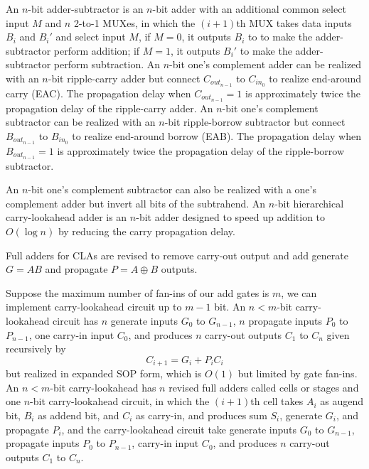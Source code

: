 \documentclass[a4paper,12pt]{report}
\begin{document}
An $n$-bit adder-subtractor is an $n$-bit adder with an additional common select input $M$ and $n$ 2-to-1 MUXes, in which the $(i+1)$th MUX takes data inputs $B_i$ and $B_i'$ and select input $M$, if $M=0$, it outputs $B_i$ to to make the adder-subtractor perform addition; if $M=1$, it outputs $B_i'$ to make the adder-subtractor perform subtraction.
An $n$-bit one's complement adder can be realized with an $n$-bit ripple-carry adder but connect $C_{out_{n-1}}$ to $C_{in_0}$ to realize end-around carry (EAC). The propagation delay when $C_{out_{n-1}}=1$ is approximately twice the propagation delay of the ripple-carry adder.
An $n$-bit one's complement subtractor can be realized with an $n$-bit ripple-borrow subtractor but connect $B_{out_{n-1}}$ to $B_{in_0}$ to realize end-around borrow (EAB). The propagation delay when $B_{out_{n-1}}=1$ is approximately twice the propagation delay of the ripple-borrow subtractor.

An $n$-bit one's complement subtractor can also be realized with a one's complement adder but invert all bits of the subtrahend.
An $n$-bit hierarchical carry-lookahead adder is an $n$-bit adder designed to speed up addition to $O(\log n)$ by reducing the carry propagation delay.

Full adders for CLAs are revised to remove carry-out output and add generate $G=AB$ and propagate $P=A\oplus B$ outputs.

Suppose the maximum number of fan-ins of our add gates is $m$, we can implement carry-lookahead circuit up to $m-1$ bit. An $n<m$-bit carry-lookahead circuit has $n$ generate inputs $G_0$ to $G_{n-1}$, $n$ propagate inputs $P_0$ to $P_{n-1}$, one carry-in input $C_0$, and produces $n$ carry-out outputs $C_1$ to $C_n$ given recursively by
\[C_{i+1}=G_i+P_iC_i\]
but realized in expanded SOP form, which is $O(1)$ but limited by gate fan-ins. An $n<m$-bit carry-lookahead has $n$ revised full adders called cells or stages and one $n$-bit carry-lookahead circuit, in which the $(i+1)$th cell takes $A_i$ as augend bit, $B_i$ as addend bit, and $C_i$ as carry-in, and produces sum $S_i$, generate $G_i$, and propagate $P_i$, and the carry-lookahead circuit take generate inputs $G_0$ to $G_{n-1}$, propagate inputs $P_0$ to $P_{n-1}$, carry-in input $C_0$, and produces $n$ carry-out outputs $C_1$ to $C_n$.
\end{document}
